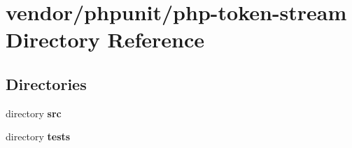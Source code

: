 \section{vendor/phpunit/php-\/token-\/stream Directory Reference}
\label{dir_11092f0cfccb5865de4f7c508b2d1bb3}
\subsection*{Directories}
\begin{DoxyCompactItemize}
\item 
directory {\bf src}
\item 
directory {\bf tests}
\end{DoxyCompactItemize}

